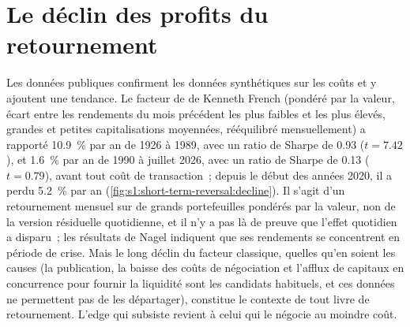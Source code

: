 \begin{omfigure}

\label{fig:s1:short-term-reversal:earnings}
\end{omfigure}

\section{Le déclin des profits du retournement}

Les données publiques confirment les données synthétiques sur les coûts et y ajoutent une tendance. Le facteur de  de Kenneth French (pondéré par la valeur, écart entre les rendements du mois précédent les plus
faibles et les plus élevés, grandes et petites capitalisations moyennées, rééquilibré mensuellement) a rapporté 10.9~\% par an de 1926 à 1989, avec un ratio de Sharpe de 0.93 ($t = 7.42$), et
1.6~\% par an de 1990 à juillet 2026, avec un ratio de Sharpe de 0.13 ($t = 0.79$), avant tout coût de transaction~; depuis le début des années 2020, il a perdu 5.2~\% par an
(\cref{fig:s1:short-term-reversal:decline}). Il s'agit d'un retournement mensuel sur de grands portefeuilles pondérés par la valeur, non de la version résiduelle quotidienne, et il n'y a pas là
de preuve que l'effet quotidien a disparu~; les résultats de Nagel indiquent que ses rendements se concentrent en période de crise. Mais le long déclin du facteur classique,
quelles qu'en soient les causes (la publication, la baisse des coûts de négociation et l'afflux de capitaux en concurrence pour fournir la liquidité sont les candidats habituels, et ces données ne permettent pas
de les départager), constitue le contexte de tout livre de retournement. L'edge qui subsiste revient à
celui qui le négocie au moindre coût.

